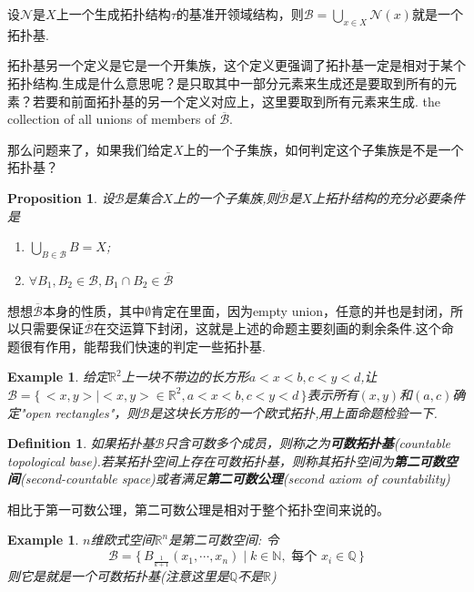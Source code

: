 \documentclass{article}
\newtheorem{proposition}[theorem]{Proposition}
\newtheorem{example}[theorem]{Example}
\newtheorem{definition}[theorem]{Definition}
\newcommand\Set[2]{\{\,#1\mid#2\,\}} %
\begin{document}
设$\mathcal{N}$是$X$上一个生成拓扑结构$\tau$的基准开领域结构，则$\mathscr{B}=\bigcup\limits_{x \in X}\mathcal{N}(x)$就是一个拓扑基.

拓扑基另一个定义是它是一个开集族，这个定义更强调了拓扑基一定是相对于某个拓扑结构.生成是什么意思呢？是只取其中一部分元素来生成还是要取到所有的元素？若要和前面拓扑基的另一个定义对应上，这里要取到所有元素来生成. the collection of all unions of members of $\overline{\mathscr{B}}$.


那么问题来了，如果我们给定$X$上的一个子集族，如何判定这个子集族是不是一个拓扑基？

\begin{proposition}
设$\mathscr{B}$是集合$X$上的一个子集族,则$\overline{\mathscr{B}}$是$X$上拓扑结构的充分必要条件是
\begin{enumerate}
	\item $\bigcup\limits_{B \in \mathscr{B}}B = X$;
	\item $\forall B_1,B_2 \in \mathscr{B},B_1 \cap B_2 \in \overline{\mathscr{B}}$
\end{enumerate}
\end{proposition}

想想$\overline{\mathscr{B}}$本身的性质，其中$\emptyset$肯定在里面，因为empty union，任意的并也是封闭，所以只需要保证$\overline{\mathscr{B}}$在交运算下封闭，这就是上述的命题主要刻画的剩余条件.这个命题很有作用，能帮我们快速的判定一些拓扑基.

\begin{example}
给定$\mathbb{R}^2$上一块不带边的长方形$a < x < b, c < y < d$,让$\mathscr{B} = \Set{<x,y>}{<x,y> \in \mathbb{R}^2, a<x<b,c <y <d}$表示所有$(x,y)$和$(a,c)$确定"open rectangles"，则$\mathscr{B}$是这块长方形的一个欧式拓扑,用上面命题检验一下.
\end{example}

\begin{definition}
如果拓扑基$\mathscr{B}$只含可数多个成员，则称之为\textbf{可数拓扑基}(countable topological base).若某拓扑空间上存在可数拓扑基，则称其拓扑空间为\textbf{第二可数空间}(second-countable space)或者满足\textbf{第二可数公理}(second axiom of countability)
\end{definition}

相比于第一可数公理，第二可数公理是相对于整个拓扑空间来说的。

\begin{example}
$n$维欧式空间$\mathbb{R}^n$是第二可数空间: 令\[\mathscr{B}=\Set{B_{\frac{1}{k+1}}(x_1,\cdots,x_n)}{k \in \mathbb{N},\text{ 每个 } x_i \in \mathbb{Q}}\]则它是就是一个可数拓扑基(注意这里是$\mathbb{Q}$不是$\mathbb{R}$)
\end{example}
\end{document}
